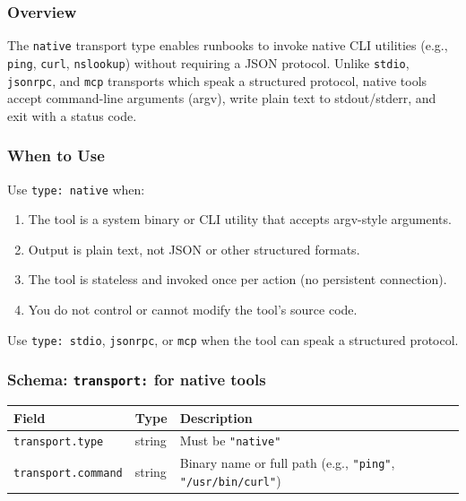 \subsubsection{Overview}

The \texttt{native} transport type enables runbooks to invoke native CLI utilities
(e.g., \texttt{ping}, \texttt{curl}, \texttt{nslookup}) without requiring a JSON
protocol.  Unlike \texttt{stdio}, \texttt{jsonrpc}, and \texttt{mcp} transports
which speak a structured protocol, native tools accept command-line arguments
(argv), write plain text to stdout/stderr, and exit with a status code.

\subsubsection{When to Use}

Use \texttt{type: native} when:
\begin{enumerate}
  \item The tool is a system binary or CLI utility that accepts argv-style
        arguments.
  \item Output is plain text, not JSON or other structured formats.
  \item The tool is stateless and invoked once per action (no persistent
        connection).
  \item You do not control or cannot modify the tool's source code.
\end{enumerate}

\noindent Use \texttt{type: stdio}, \texttt{jsonrpc}, or \texttt{mcp} when the
tool can speak a structured protocol.

\subsubsection{Schema: \texttt{transport:} for native tools}

\begin{center}
\begin{tabular}{llp{8cm}}
\hline
\textbf{Field} & \textbf{Type} & \textbf{Description} \\
\hline
\texttt{transport.type}    & string & Must be \texttt{"native"} \\
\texttt{transport.command} & string & Binary name or full path (e.g., \texttt{"ping"}, \texttt{"/usr/bin/curl"}) \\
\hline
\end{tabular}
\end{center}

